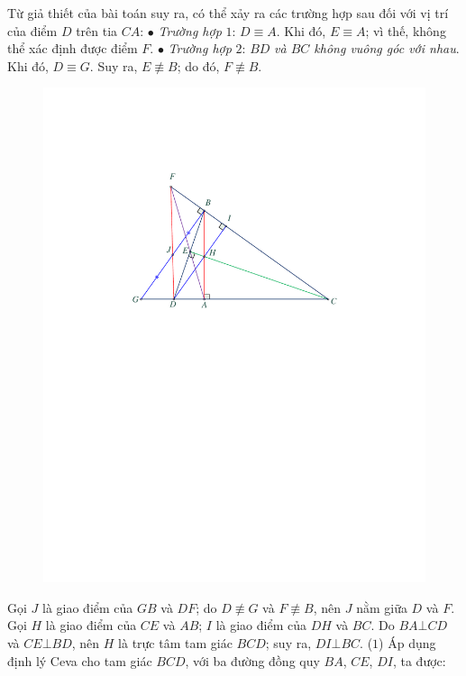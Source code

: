 \begin{multicols}{2}
	Từ giả thiết của bài toán suy ra, có thể xảy ra các trường hợp sau đối với vị trí của điểm $D$ trên tia $CA$:
	\vskip 0.05cm
	$\bullet$ \textit{Trường hợp} $1$: $D \equiv A$.
	\vskip 0.05cm
	Khi đó, $E \equiv A$; vì thế, không thể xác định được điểm $F$.
	\vskip 0.05cm
	$\bullet$ \textit{Trường hợp} $2$: $BD$ \textit{và $BC$ không vuông góc với nhau}.
	\vskip 0.05cm
	Khi đó, $D \equiv G$.  Suy ra, $E \not\equiv B$; do đó, $F \not\equiv B$.  
	\begin{figure}[H]
		\centering
		\vspace*{-5pt}
		\captionsetup{labelformat= empty, justification=centering}
		\includegraphics[width=0.9\linewidth]{P615H1}
		\vspace*{-15pt}
	\end{figure}
	Gọi $J$ là giao điểm của $GB$ và $DF$; do $D \not\equiv G$  và $F \not\equiv B$,  nên $J$ nằm giữa $D$ và $F$.
	\vskip 0.05cm
	Gọi $H$ là giao điểm của $CE$ và $AB$; $I$ là giao điểm của $DH$ và $BC$.
	\vskip 0.05cm
	Do $BA \bot CD$ và $CE \bot BD$, nên $H$ là trực tâm tam giác $BCD$; suy ra, $DI \bot BC$. \hfill                                   ($1$)
	\vskip 0.05cm
	Áp dụng định lý Ceva cho tam giác $BCD$, với ba đường đồng quy $BA$, $CE$, $DI$, ta được:

\end{multicols}
